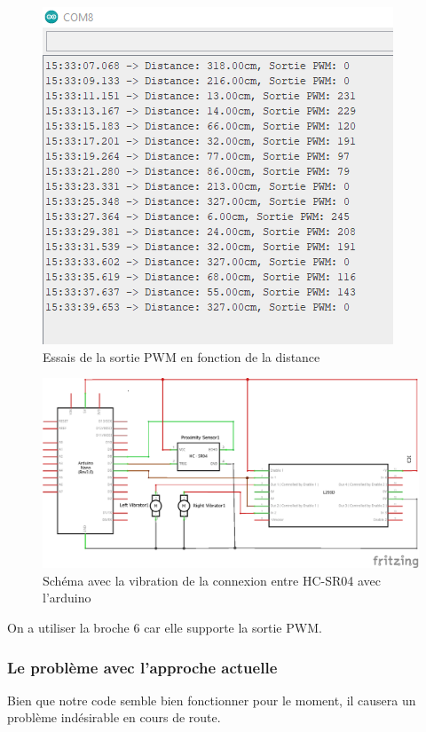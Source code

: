 \FloatBarrier

\begin{figure}[!htbp]
    \centering
    \includegraphics[width=.5\linewidth]{assets/HC-SR04/essais/PWM en fonction de distance.png}
    \caption{Essais de la sortie \acrshort{PWM} en fonction de la distance}
\end{figure}

\FloatBarrier

\begin{figure}[!htbp]
    \centering
    \includegraphics[width=\linewidth]{assets/HC-SR04/circuit avec vibration.png}
    \caption{Schéma avec la vibration de la connexion entre HC-SR04 avec l’arduino}
\end{figure}

\FloatBarrier

On a utiliser la broche 6 car elle supporte la sortie \acrfull{PWM}.

\subsubsection{Le problème avec l'approche actuelle}
Bien que notre code semble bien fonctionner pour le moment, il causera un problème indésirable en cours de route.

